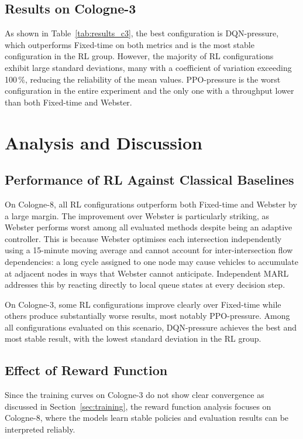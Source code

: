 \subsection{Results on Cologne-3}

As shown in Table~\ref{tab:results_c3}, the best configuration is DQN-pressure,
which outperforms Fixed-time on both metrics and is the most stable
configuration in the RL group. However, the majority of RL configurations
exhibit large standard deviations, many with a coefficient of variation
exceeding 100\,\%, reducing the reliability of the mean values. PPO-pressure
is the worst configuration in the entire experiment and the only one with a
throughput lower than both Fixed-time and Webster.

\section{Analysis and Discussion}

\subsection{Performance of RL Against Classical Baselines}

On Cologne-8, all RL configurations outperform both Fixed-time and Webster by
a large margin. The improvement over Webster is particularly striking, as
Webster performs worst among all evaluated methods despite being an adaptive
controller. This is because Webster optimises each intersection independently
using a 15-minute moving average and cannot account for inter-intersection flow
dependencies: a long cycle assigned to one node may cause vehicles to accumulate
at adjacent nodes in ways that Webster cannot anticipate. Independent MARL
addresses this by reacting directly to local queue states at every decision step.

On Cologne-3, some RL configurations improve clearly over Fixed-time while
others produce substantially worse results, most notably PPO-pressure. Among
all configurations evaluated on this scenario, DQN-pressure achieves the best
and most stable result, with the lowest standard deviation in the RL group.

\subsection{Effect of Reward Function}

Since the training curves on Cologne-3 do not show clear convergence as
discussed in Section~\ref{sec:training}, the reward function analysis focuses
on Cologne-8, where the models learn stable policies and evaluation results
can be interpreted reliably.


